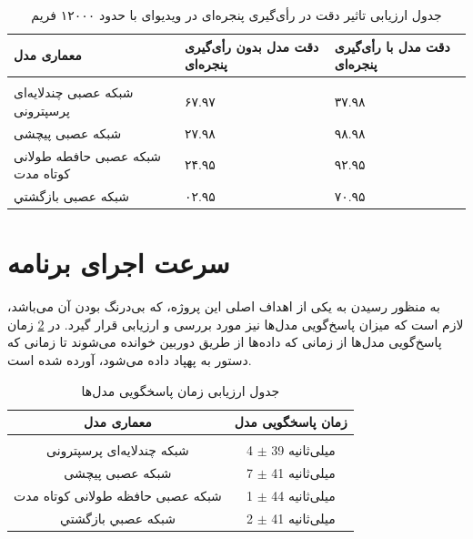 \begin{table}[h!]
    \centering
    \begin{tabular}{||>{\centering\arraybackslash}p{5.5cm} >{\centering\arraybackslash}p{4cm} >{\centering\arraybackslash}p{4cm}||}
     \hline
     \rule{0pt}{3ex} معماری مدل & دقت مدل بدون رأی‌گیری پنجره‌ای & دقت مدل با رأی‌گیری پنجره‌ای \\ [1.5ex]
     \hline
     \hline
     \rule{0pt}{0.5ex} & & \\  
     شبکه عصبی چندلایه‌ای پرسپترونی & ۶۷.۹۷ & ۳۷.۹۸ \\ [2.5ex]
     شبکه عصبی پیچشی & ۲۷.۹۸ & ۹۸.۹۸ \\ [2.5ex]
     شبکه عصبی حافطه طولانی کوتاه مدت & ۲۴.۹۵ & ۹۲.۹۵ \\ [2.5ex]
     شبکه عصبی بازگشتي & ۰۲.۹۵ & ۷۰.۹۵ \\ [2.5ex]
     \hline
    \end{tabular}
    \caption{جدول ارزیابی تاثیر دقت در رأی‌گیری پنجره‌ای در ویدیو‌ای با حدود ۱۲۰۰۰ فریم}
    \centering
    \label{table:window}
\end{table}


\section{سرعت اجرای برنامه}
به منظور رسیدن به یکی از اهداف اصلی این پروژه، که بی‌درنگ بودن آن می‌باشد، لازم است که میزان پاسخ‌گویی مدل‌ها نیز مورد بررسی و ارزیابی قرار گیرد. در 
\cref{table:1}
زمان پاسخ‌گویی مدل‌ها از زمانی که داده‌ها از طریق دوربین خوانده می‌شوند تا زمانی که دستور به پهپاد داده می‌شود، آورده شده است.

\begin{table}[h!]
    \centering
    \begin{tabular}{||c c||}
     \hline
     \rule{0pt}{3ex}معماری مدل & زمان پاسخگویی مدل\\ [1.5ex]
     \hline
     \hline
     \rule{0pt}{0.5ex} & \\  %
     شبکه چندلایه‌ای پرسپترونی & 4 $\pm$ 39 میلی‌ثانیه \\ [2.5ex]
     شبکه عصبی پیچشی & 7 $\pm$ 41 میلی‌ثانیه  \\ [2.5ex]
     شبکه عصبی  حافظه طولانی کوتاه مدت & 1 $\pm$ 44 میلی‌ثانیه  \\ [2.5ex]
     شبكه عصبي بازگشتي & 2 $\pm$ 41 میلی‌ثانیه  \\ [2.5ex]

     \hline
    \end{tabular}
    \caption{جدول ارزیابی زمان پاسخگویی مدل‌ها}
    \label{table:1}
\end{table}


